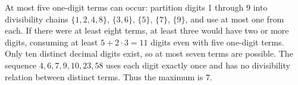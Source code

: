 At most five one-digit terms can occur: partition digits 1 through 9 into divisibility chains $\{1,2,4,8\}$, $\{3,6\}$, $\{5\}$, $\{7\}$, $\{9\}$, and use at most one from each. If there were at least eight terms, at least three would have two or more digits, consuming at least $ 5+2\cdot3=11 $ digits even with five one-digit terms. Only ten distinct decimal digits exist, so at most seven terms are possible. The sequence $ 4,6,7,9,10,23,58 $ uses each digit exactly once and has no divisibility relation between distinct terms. Thus the maximum is $\boxed7 $.

